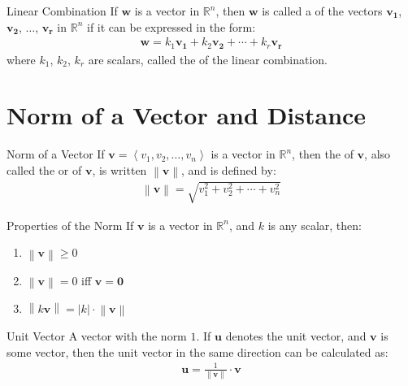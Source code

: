 \documentclass[\main/notes.tex]{subfiles}
\begin{document}
			\begin{theorem}{Linear Combination}
				If $\mathbf{w}$ is a vector in $\mathbb{R}^{n}$, then $\mathbf{w}$ is called a  of the vectors $\mathbf{v_{1}}$, $\mathbf{v_{2}}$, $\ldots$, $\mathbf{v_{r}}$ in $\mathbb{R}^{n}$ if it can be expressed in the form:
				\begin{align*}
					\mathbf{w} = k_{1}\mathbf{v_{1}} + k_{2}\mathbf{v_{2}} + \cdots + k_{r}\mathbf{v_{r}}
				\end{align*}
				where $k_{1}$, $k_{2}$, $k_{r}$ are scalars, called the  of the linear combination.
			\end{theorem}

		\section{Norm of a Vector and Distance}
			\begin{definition}{Norm of a Vector}
				If $\mathbf{v} = \left\langle v_{1}, v_{2}, \ldots, v_{n}\right\rangle$ is a vector in $\mathbb{R}^{n}$, then the  of $\mathbf{v}$, also called the  or  of $\mathbf{v}$, is written $\left\lVert \mathbf{v}\right\rVert$, and is defined by:
				\begin{align*}
					\left\lVert \mathbf{v}\right\rVert = \sqrt{v_{1}^{2} + v_{2}^{2} + \cdots + v_{n}^{2}}
				\end{align*}
			\end{definition}
			\begin{sidenote}{Properties of the Norm}
				If $\mathbf{v}$ is a vector in $\mathbb{R}^{n}$, and $k$ is any scalar, then:
				\begin{enumerate}[label=(\alph*)]
					\item $ \left\lVert \mathbf{v}\right\rVert \geq 0$
					\item $ \left\lVert \mathbf{v}\right\rVert = 0$ iff $\mathbf{v} = \mathbf{0}$
					\item $ \left\lVert k\mathbf{v}\right\rVert = \left\lvert k\right\rvert \cdot \left\lVert \mathbf{v}\right\rVert$
				\end{enumerate}
			\end{sidenote}
			\begin{definition}{Unit Vector}
				A vector with the norm $1$. If $\mathbf{u}$ denotes the unit vector, and $\mathbf{v}$ is some vector, then the unit vector in the same direction can be calculated as:
				\begin{align*}
					\mathbf{u} = \frac{1}{\left\lVert \mathbf{v}\right\rVert} \cdot \mathbf{v}
				\end{align*}
			\end{definition}
\end{document}
